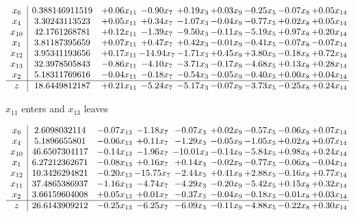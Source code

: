 \documentclass[9pt]{article}
\begin{document}
 \[\begin{array}{c| c c@{\hskip 2pt} c@{\hskip 2pt} c@{\hskip 2pt} c@{\hskip 2pt} c@{\hskip 2pt} c@{\hskip 2pt} c@{\hskip 2pt} }
 x_{6}   &  0.388146911519 & +  0.06 x_{11} & -0.90 x_{7} & +  0.19 x_{3} & +  0.03 x_{9} & -0.25 x_{5} & -0.07 x_{8} & +  0.05 x_{14}\\
 x_{4}   &  3.30243113523 & +  0.05 x_{11} & +  0.34 x_{7} & -1.07 x_{3} & -0.04 x_{9} & -0.77 x_{5} & +  0.02 x_{8} & +  0.05 x_{14}\\
 x_{10}   &  42.1761268781 & +  0.12 x_{11} & -1.39 x_{7} & -9.50 x_{3} & -0.11 x_{9} & -5.19 x_{5} & +  0.97 x_{8} & +  0.20 x_{14}\\
 x_{1}   &  3.81187395659 & +  0.07 x_{11} & +  0.47 x_{7} & +  0.42 x_{3} & -0.01 x_{9} & -0.41 x_{5} & -0.07 x_{8} & -0.07 x_{14}\\
 x_{12}   &  3.95341193656 & +  0.17 x_{11} & -14.94 x_{7} & -1.71 x_{3} & +  0.45 x_{9} & +  3.80 x_{5} & -0.18 x_{8} & +  0.72 x_{14}\\
 x_{13}   &  32.3978505843 & -0.86 x_{11} & -4.10 x_{7} & -3.71 x_{3} & -0.17 x_{9} & -4.68 x_{5} & +  0.13 x_{8} & +  0.28 x_{14}\\
 x_{2}   &  5.18311769616 & -0.04 x_{11} & -0.18 x_{7} & -0.54 x_{3} & -0.05 x_{9} & -0.40 x_{5} & +  0.00 x_{8} & +  0.04 x_{14}\\
\hline
z    &  18.6449812187 & +  0.21 x_{11} & -5.24 x_{7} & -5.17 x_{3} & -0.07 x_{9} & -3.73 x_{5} & -0.25 x_{8} & +  0.24 x_{14}\\
\end{array}\]


 $ x_{11} $ enters and $ x_{13} $ leaves 

 \[\begin{array}{c| c c@{\hskip 2pt} c@{\hskip 2pt} c@{\hskip 2pt} c@{\hskip 2pt} c@{\hskip 2pt} c@{\hskip 2pt} c@{\hskip 2pt} }
 x_{6}   &  2.6098032114 & -0.07 x_{13} & -1.18 x_{7} & -0.07 x_{3} & +  0.02 x_{9} & -0.57 x_{5} & -0.06 x_{8} & +  0.07 x_{14}\\
 x_{4}   &  5.1896655801 & -0.06 x_{13} & +  0.11 x_{7} & -1.29 x_{3} & -0.05 x_{9} & -1.05 x_{5} & +  0.02 x_{8} & +  0.07 x_{14}\\
 x_{10}   &  46.6507304117 & -0.14 x_{13} & -1.96 x_{7} & -10.01 x_{3} & -0.14 x_{9} & -5.84 x_{5} & +  0.98 x_{8} & +  0.24 x_{14}\\
 x_{1}   &  6.27212362671 & -0.08 x_{13} & +  0.16 x_{7} & +  0.14 x_{3} & -0.02 x_{9} & -0.77 x_{5} & -0.06 x_{8} & -0.04 x_{14}\\
 x_{12}   &  10.3426294821 & -0.20 x_{13} & -15.75 x_{7} & -2.44 x_{3} & +  0.41 x_{9} & +  2.88 x_{5} & -0.16 x_{8} & +  0.77 x_{14}\\
 x_{11}   &  37.4865386937 & -1.16 x_{13} & -4.74 x_{7} & -4.29 x_{3} & -0.20 x_{9} & -5.42 x_{5} & +  0.15 x_{8} & +  0.32 x_{14}\\
 x_{2}   &  3.66159604008 & +  0.05 x_{13} & +  0.01 x_{7} & -0.37 x_{3} & -0.04 x_{9} & -0.18 x_{5} & -0.01 x_{8} & +  0.03 x_{14}\\
\hline
z    &  26.6143909212 & -0.25 x_{13} & -6.25 x_{7} & -6.09 x_{3} & -0.11 x_{9} & -4.88 x_{5} & -0.22 x_{8} & +  0.30 x_{14}\\
\end{array}\]
\end{document}
